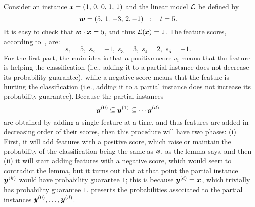 \begin{example}\label{ex:greedy}
 Consider an instance ${\bm{x}} = (1,\, 0, \, 0, \, 1, \, 1)$ and the linear model $\mathcal{L}$ be defined by 
 \[ 
    {\bm{w}} = (5, \, 1, \, -3,\, 2, -1) \quad ; \quad t = 5.
 \]
 It is easy to check that ${\bm{w}} \cdot {\bm{x}} = 5$, and thus $\mathcal{L}({\bm{x}}) = 1$. The feature scores, according to~, are:
 \[
  s_1 = 5, \; s_2 = -1, \; s_3 = 3, \; s_4 = 2, \; s_5 = -1.
 \]
For the first part, the main idea is that a positive score $s_i$ means that the feature is helping the classification (i.e., adding it to a partial instance does not decrease its probability guarantee), while a negative score means that the feature is hurting the classification (i.e., adding it to a partial instance does not increase its probability guarantee). 
Because the partial instances 
\[ {\bm{y}}^{(0)} \subseteq {\bm{y}}^{(1)} \subseteq \cdots {\bm{y}}^{(d)}
\] 
are obtained by adding a single feature at a time, and thus features are added in decreasing order of their scores, then this procedure will have two phases: (i) First, it will add features with a positive score, which raise or maintain the probability of the classification being the same as ${\bm{x}}$, as the lemma says, and then (ii) it will start adding features with a negative score, which would seem to contradict the lemma, but it turns out that at that point the partial instance ${\bm{y}}^{(k)}$ would have probability guarantee $1$; this is because ${\bm{y}}^{(d)} = {\bm{x}}$, which trivially has probability guarantee $1$.
 presents the probabilities associated to the partial instances ${\bm{y}}^{(0)}, \ldots, {\bm{y}}^{(d)}$.


\end{example}
